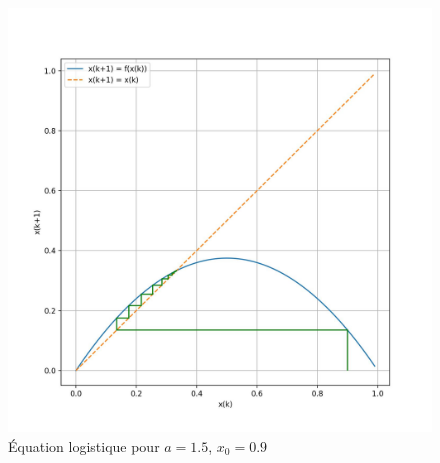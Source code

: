             \begin{figure}[ht!]
                \centering
                \includegraphics[width=\textwidth]{images/logistique_differences_4.jpg}
                \caption{Équation logistique pour $a=1.5$, $x_0=0.9$}
                \label{fig:logistique_differences_4}
            \end{figure}

